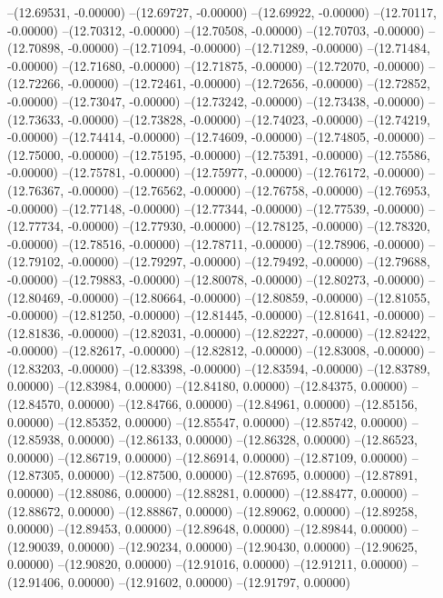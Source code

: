 --(12.69531, -0.00000)
--(12.69727, -0.00000)
--(12.69922, -0.00000)
--(12.70117, -0.00000)
--(12.70312, -0.00000)
--(12.70508, -0.00000)
--(12.70703, -0.00000)
--(12.70898, -0.00000)
--(12.71094, -0.00000)
--(12.71289, -0.00000)
--(12.71484, -0.00000)
--(12.71680, -0.00000)
--(12.71875, -0.00000)
--(12.72070, -0.00000)
--(12.72266, -0.00000)
--(12.72461, -0.00000)
--(12.72656, -0.00000)
--(12.72852, -0.00000)
--(12.73047, -0.00000)
--(12.73242, -0.00000)
--(12.73438, -0.00000)
--(12.73633, -0.00000)
--(12.73828, -0.00000)
--(12.74023, -0.00000)
--(12.74219, -0.00000)
--(12.74414, -0.00000)
--(12.74609, -0.00000)
--(12.74805, -0.00000)
--(12.75000, -0.00000)
--(12.75195, -0.00000)
--(12.75391, -0.00000)
--(12.75586, -0.00000)
--(12.75781, -0.00000)
--(12.75977, -0.00000)
--(12.76172, -0.00000)
--(12.76367, -0.00000)
--(12.76562, -0.00000)
--(12.76758, -0.00000)
--(12.76953, -0.00000)
--(12.77148, -0.00000)
--(12.77344, -0.00000)
--(12.77539, -0.00000)
--(12.77734, -0.00000)
--(12.77930, -0.00000)
--(12.78125, -0.00000)
--(12.78320, -0.00000)
--(12.78516, -0.00000)
--(12.78711, -0.00000)
--(12.78906, -0.00000)
--(12.79102, -0.00000)
--(12.79297, -0.00000)
--(12.79492, -0.00000)
--(12.79688, -0.00000)
--(12.79883, -0.00000)
--(12.80078, -0.00000)
--(12.80273, -0.00000)
--(12.80469, -0.00000)
--(12.80664, -0.00000)
--(12.80859, -0.00000)
--(12.81055, -0.00000)
--(12.81250, -0.00000)
--(12.81445, -0.00000)
--(12.81641, -0.00000)
--(12.81836, -0.00000)
--(12.82031, -0.00000)
--(12.82227, -0.00000)
--(12.82422, -0.00000)
--(12.82617, -0.00000)
--(12.82812, -0.00000)
--(12.83008, -0.00000)
--(12.83203, -0.00000)
--(12.83398, -0.00000)
--(12.83594, -0.00000)
--(12.83789, 0.00000)
--(12.83984, 0.00000)
--(12.84180, 0.00000)
--(12.84375, 0.00000)
--(12.84570, 0.00000)
--(12.84766, 0.00000)
--(12.84961, 0.00000)
--(12.85156, 0.00000)
--(12.85352, 0.00000)
--(12.85547, 0.00000)
--(12.85742, 0.00000)
--(12.85938, 0.00000)
--(12.86133, 0.00000)
--(12.86328, 0.00000)
--(12.86523, 0.00000)
--(12.86719, 0.00000)
--(12.86914, 0.00000)
--(12.87109, 0.00000)
--(12.87305, 0.00000)
--(12.87500, 0.00000)
--(12.87695, 0.00000)
--(12.87891, 0.00000)
--(12.88086, 0.00000)
--(12.88281, 0.00000)
--(12.88477, 0.00000)
--(12.88672, 0.00000)
--(12.88867, 0.00000)
--(12.89062, 0.00000)
--(12.89258, 0.00000)
--(12.89453, 0.00000)
--(12.89648, 0.00000)
--(12.89844, 0.00000)
--(12.90039, 0.00000)
--(12.90234, 0.00000)
--(12.90430, 0.00000)
--(12.90625, 0.00000)
--(12.90820, 0.00000)
--(12.91016, 0.00000)
--(12.91211, 0.00000)
--(12.91406, 0.00000)
--(12.91602, 0.00000)
--(12.91797, 0.00000)
